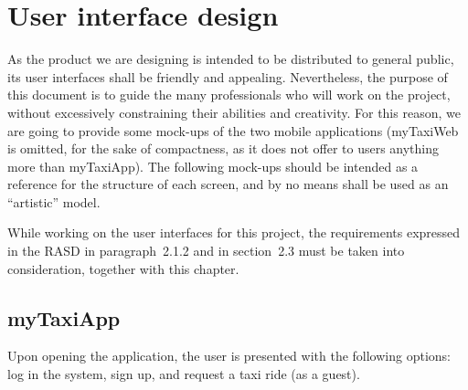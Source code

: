 \chapter{User interface design} \label{chap:userinterface}
As the product we are designing is intended to be distributed to general public, its user interfaces shall be friendly and appealing. Nevertheless, the purpose of this document is to guide the many professionals who will work on the project, without excessively constraining their abilities and creativity. For this reason, we are going to provide some mock-ups of the two mobile applications (myTaxiWeb is omitted, for the sake of compactness, as it does not offer to users anything more than myTaxiApp). The following mock-ups should be intended as a reference for the structure of each screen, and by no means shall be used as an ``artistic'' model.

While working on the user interfaces for this project, the requirements expressed in the RASD in paragraph~2.1.2 and in section~2.3 must be taken into consideration, together with this chapter.


\section{myTaxiApp}
Upon opening the application, the user is presented with the following options: log in the system, sign up, and request a taxi ride (as a guest).


